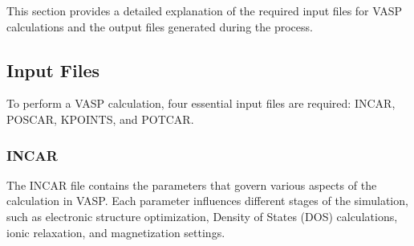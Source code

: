 This section provides a detailed explanation of the required input files for VASP calculations and the output files generated during the process.

\subsection{Input Files}
To perform a VASP calculation, four essential input files are required: INCAR, POSCAR, KPOINTS, and POTCAR.

\subsubsection{INCAR}
The INCAR file contains the parameters that govern various aspects of the calculation in VASP. Each parameter influences different stages of the simulation, such as electronic structure optimization, Density of States (DOS) calculations, ionic relaxation, and magnetization settings.

